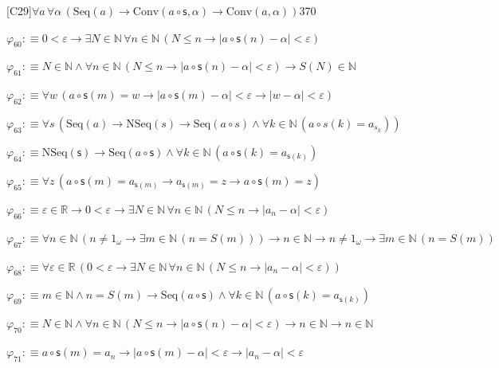 \begin{fullproof}{[C29]}{$\forall a\,\forall \alpha\,(\mathrm{Seq}(a) \to \mathrm{Conv}(a \circ \mathsf{s},\alpha) \to \mathrm{Conv}(a,\alpha))$}{370}
\begin{abbrevlist}
\item $\varphi_{60} :\equiv 0 < \varepsilon \to \exists N \in \mathbb{N}\,\forall n \in \mathbb{N}\,(N \leq n \to \lvert a \circ \mathsf{s}(n) - \alpha \rvert < \varepsilon)$
\item $\varphi_{61} :\equiv N \in \mathbb{N} \land \forall n \in \mathbb{N}\,(N \leq n \to \lvert a \circ \mathsf{s}(n) - \alpha \rvert < \varepsilon) \to S(N) \in \mathbb{N}$
\item $\varphi_{62} :\equiv \forall w\,(a \circ \mathsf{s}(m) = w \to \lvert a \circ \mathsf{s}(m) - \alpha \rvert < \varepsilon \to \lvert w - \alpha \rvert < \varepsilon)$
\item $\varphi_{63} :\equiv \forall s\,(\mathrm{Seq}(a) \to \mathrm{NSeq}(s) \to \mathrm{Seq}(a \circ s) \land \forall k \in \mathbb{N}\,(a \circ s(k) = a_{s_{k}}))$
\item $\varphi_{64} :\equiv \mathrm{NSeq}(\mathsf{s}) \to \mathrm{Seq}(a \circ \mathsf{s}) \land \forall k \in \mathbb{N}\,(a \circ \mathsf{s}(k) = a_{\mathsf{s}(k)})$
\item $\varphi_{65} :\equiv \forall z\,(a \circ \mathsf{s}(m) = a_{\mathsf{s}(m)} \to a_{\mathsf{s}(m)} = z \to a \circ \mathsf{s}(m) = z)$
\item $\varphi_{66} :\equiv \varepsilon \in \mathbb{R} \to 0 < \varepsilon \to \exists N \in \mathbb{N}\,\forall n \in \mathbb{N}\,(N \leq n \to \lvert a_{n} - \alpha \rvert < \varepsilon)$
\item $\varphi_{67} :\equiv \forall n \in \mathbb{N}\,(n \neq 1_{\omega} \to \exists m \in \mathbb{N}\,(n = S(m))) \to n \in \mathbb{N} \to n \neq 1_{\omega} \to \exists m \in \mathbb{N}\,(n = S(m))$
\item $\varphi_{68} :\equiv \forall \varepsilon \in \mathbb{R}\,(0 < \varepsilon \to \exists N \in \mathbb{N}\,\forall n \in \mathbb{N}\,(N \leq n \to \lvert a_{n} - \alpha \rvert < \varepsilon))$
\item $\varphi_{69} :\equiv m \in \mathbb{N} \land n = S(m) \to \mathrm{Seq}(a \circ \mathsf{s}) \land \forall k \in \mathbb{N}\,(a \circ \mathsf{s}(k) = a_{\mathsf{s}(k)})$
\item $\varphi_{70} :\equiv N \in \mathbb{N} \land \forall n \in \mathbb{N}\,(N \leq n \to \lvert a \circ \mathsf{s}(n) - \alpha \rvert < \varepsilon) \to n \in \mathbb{N} \to n \in \mathbb{N}$
\item $\varphi_{71} :\equiv a \circ \mathsf{s}(m) = a_{n} \to \lvert a \circ \mathsf{s}(m) - \alpha \rvert < \varepsilon \to \lvert a_{n} - \alpha \rvert < \varepsilon$

\end{abbrevlist}
\end{fullproof}
